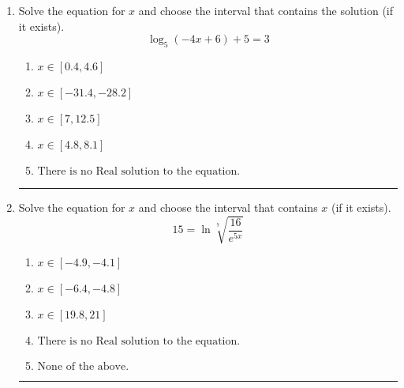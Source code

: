 \documentclass[14pt]{extbook}
\newcommand{\litem}[1]{\item#1\hspace*{-1cm}\rule{\textwidth}{0.4pt}}
\begin{document}
\begin{enumerate}
{\begin{enumerate}[label=\Alph*.]
\end{enumerate} }
\litem{
Solve the equation for $x$ and choose the interval that contains the solution (if it exists).\[ \log_{5}{(-4x+6)}+5 = 3 \]\begin{enumerate}[label=\Alph*.]
\item \( x \in [0.4, 4.6] \)
\item \( x \in [-31.4, -28.2] \)
\item \( x \in [7, 12.5] \)
\item \( x \in [4.8, 8.1] \)
\item \( \text{There is no Real solution to the equation.} \)

\end{enumerate} }
\litem{
 Solve the equation for $x$ and choose the interval that contains $x$ (if it exists).\[  15 = \ln{\sqrt[7]{\frac{16}{e^{5x}}}} \]\begin{enumerate}[label=\Alph*.]
\item \( x \in [-4.9, -4.1] \)
\item \( x \in [-6.4, -4.8] \)
\item \( x \in [19.8, 21] \)
\item \( \text{There is no Real solution to the equation.} \)
\item \( \text{None of the above.} \)

\end{enumerate} }
\end{enumerate}
\end{document}

